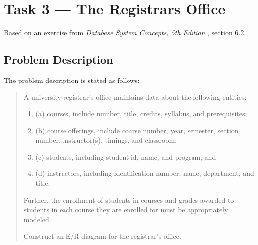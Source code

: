 %
%
%


\section{Task 3 --- The Registrars Office}
Based on an exercise from \emph{Database System Concepts, 5th Edition}
\cite{2dv513:dsc}, section 6.2.

\subsection{Problem Description}
The problem description \cite{2dv513:assignment1-instructions} is stated as
follows:

\begin{quote}
  A university registrar's oﬃce maintains data about the following entities:

  \begin{enumerate}
    \item
      (a) courses, include number, title, credits, syllabus, and prerequisites;

    \item
      (b) course oﬀerings, include course number, year, semester, section number,
      instructor(s), timings, and classroom;
  
    \item
      (c) students, including student-id, name, and program; and
  
    \item
      (d) instructors, including identification number, name, department, and
      title.
  \end{enumerate}

  Further, the enrollment of students in courses and grades awarded to students
  in each course they are enrolled for must be appropriately modeled.
  
  Construct an E/R diagram for the registrar's oﬃce.
\end{quote}


